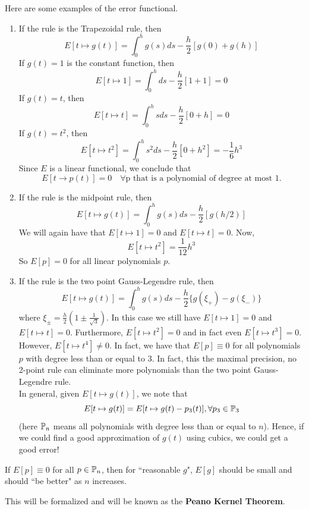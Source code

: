 \documentclass{article}
\begin{document}
\begin{example}
    Here are some examples of the error functional.
    \begin{enumerate}
        \item If the rule is the Trapezoidal rule, then
        \[E[t \mapsto g(t)] = \int_0^h g(s) ds - \frac{h}{2} [g(0) + g(h)]\]
        If $g(t) = 1$ is the constant function, then
        \[E[t \mapsto 1] = \int_0^h ds - \frac{h}{2}[1 + 1] = 0\]
        If $g(t) = t$, then
        \[E[t \mapsto t] = \int_0^h s ds - \frac{h}{2}[0 + h] = 0\]
        If $g(t) = t^2$, then
        \[E[t \mapsto t^2] = \int_0^h s^2 ds - \frac{h}{2}[0 + h^2] = -\frac{1}{6} h^3\]
    Since $E$ is a linear functional, we conclude that
    \[E[t \to p(t)] = 0 \quad \forall \text{p that is a polynomial of degree at most $1$.}\]

        \item If the rule is the midpoint rule, then
        \[E[t \mapsto g(t)] = \int_0^h g(s) ds - \frac{h}{2} [g(h/2)]\]
        We will again have that $E[t \mapsto 1] = 0$ and $E[t \mapsto t] = 0$. Now,
        \[E[t \mapsto t^2] = \frac{1}{12} h^{3}\]
        So $E[p] = 0$ for all linear polynomials $p$.

        \item If the rule is the two point Gauss-Legendre rule, then
        \[E[t \mapsto g(t)] = \int_0^h g(s) ds - \frac{h}{2} \{g(\xi_+) - g(\xi_-)\}\]
        where $\xi_{\pm} = \frac{h}{2} (1 \pm \frac{1}{\sqrt{3}})$. In this case we still have $E[t \mapsto 1] = 0$ and $E[t \mapsto t] = 0$. Furthermore, $E[t \mapsto t^2] = 0$ and in fact even $E[t \mapsto t^3] = 0$. However, $E[t \mapsto t^4] \neq 0$. In fact, we have that $E[p] \equiv 0$ for all polynomials $p$ with degree less than or equal to $3$. In fact, this the maximal precision, no 2-point rule can eliminate more polynomials than the two point Gauss-Legendre rule.\\

        In general, given $E[t \mapsto g(t)]$, we note that
        \[E[t \mapsto g(t)] = E[t \mapsto g(t) - p_3(t)], \forall p_3 \in \mathbb{P}_3\]
        (here $\mathbb{P}_n$ means all polynomials with degree less than or equal to $n$). Hence, if we could find a good approximation of $g(t)$ using cubics, we could get a good error!
    \end{enumerate}
\end{example}

\begin{conjecture}
    If $E[p] \equiv 0$ for all $p \in \mathbb{P}_n$, then for ``reasonable $g$", $E[g]$ should be small and should ``be better" as $n$ increases. 
\end{conjecture}

This will be formalized and will be known as the \textbf{Peano Kernel Theorem}.
\end{document}
